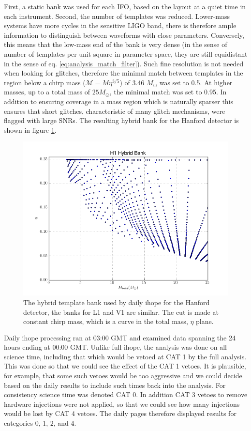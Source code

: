 First, a static bank was used for each IFO, based on the layout at a
quiet time in each instrument.  Second, the number of templates was
reduced.  Lower-mass systems have more cycles in the sensitive LIGO
band, there is therefore ample information to distinguish between
waveforms with close parameters.  Conversely, this means that the
low-mass end of the bank is very dense (in the sense of number of
templates per unit square in parameter space, they are still
equidistant in the sense of eq. \ref{eq:analysis_match_filter}).  Such
fine resolution is not needed when looking for glitches, therefore the
minimal match between templates in the region below a chirp mass
($\mathcal{M} = M \eta^{3/5}$) of 3.46 $M_\odot$ was set to 0.5.  At
higher masses, up to a total mass of $25 M_\odot$, the minimal match
was set to 0.95.  In addition to ensuring coverage in a mass region
which is naturally sparser this ensures that short glitches,
characteristic of many glitch mechanisms, were flagged with large
SNRs.  The resulting hybrid bank for the Hanford detector is shown in
figure \ref{f:daily_ihope_bank}.

\begin{figure}
  \includegraphics[width=\linewidth]{figures/detchar/hybrid_bank.png}
  \caption[The hybrid template bank used by daily ihope]{
  \label{f:daily_ihope_bank}
The hybrid template bank used by daily ihope for the Hanford detector,
the banks for L1 and V1 are similar.
The cut is made at constant chirp mass, which is
a curve in the total mass, $\eta$ plane.}
\end{figure}%

Daily ihope processing ran at 03:00 GMT and examined data spanning the
24 hours ending at 00:00 GMT.  Unlike full ihope, the analysis was
done on all science time, including that which would be vetoed at CAT
1 by the full analysis.  This was done so that we could see the effect
of the CAT 1 vetoes.  It is plausible, for example, that some such
vetoes would be too aggressive and we could decide based on the daily
results to include such times back into the analysis.  For consistency
science time was denoted CAT 0.  In addition CAT 3 vetoes to remove
hardware injections were not applied, so that we could see how many
injections would be lost by CAT 4 vetoes.  The daily pages therefore
displayed results for categories 0, 1, 2, and 4.

